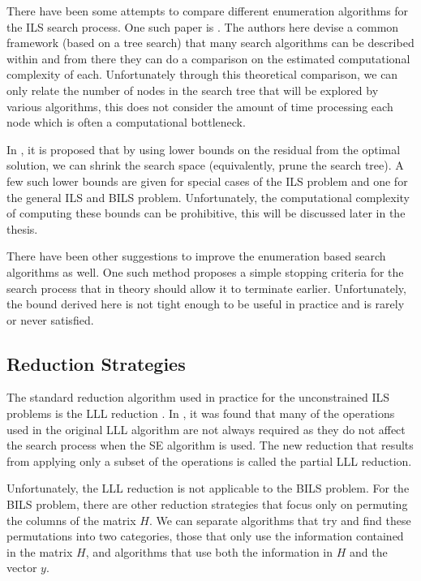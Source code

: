 \documentclass[12pt,Bold,letterpaper]{mcgilletdclass}
\begin{document}
There have been some attempts to compare different enumeration algorithms for the ILS search process. One such paper is \cite{MurGDC06}. The authors here devise a common framework (based on a tree search) that many search algorithms can be described within and from there they can do a comparison on the estimated computational complexity of each. Unfortunately through this theoretical comparison, we can only relate the number of nodes in the search tree that will be explored by various algorithms, this does not consider the amount of time processing each node which is often a computational bottleneck.

In \cite{StoVH08}, it is proposed that by using lower bounds on the residual from the optimal solution, we can shrink the search space (equivalently, prune the search tree). A few such lower bounds are given for special cases of the ILS problem and one for the general ILS and BILS problem. Unfortunately, the computational complexity of computing these bounds can be prohibitive, this will be discussed later in the thesis.

There have been other suggestions to improve the enumeration based search algorithms as well. One such method \cite{SchFL09} proposes a simple stopping criteria for the search process that in theory should allow it to terminate earlier. Unfortunately, the bound derived here is not tight enough to be useful in practice and is rarely or never satisfied.

\subsection{Reduction Strategies}

The standard reduction algorithm used in practice for the unconstrained ILS problems is the LLL reduction \cite{LenLL82}. In \cite{Bor10}, it was found that many of the operations used in the original LLL algorithm are not always required as they do not affect the search process when the SE algorithm is used. The new reduction that results from applying only a subset of the operations is called the partial LLL reduction.

Unfortunately, the LLL reduction is not applicable to the BILS problem. For the BILS problem, there are other reduction strategies that focus only on permuting the columns of the matrix $H$. We can separate algorithms that try and find these permutations into two categories, those that only use the information contained in the matrix $H$, and algorithms that use both the information in $H$ and the vector $y$.
\end{document}
